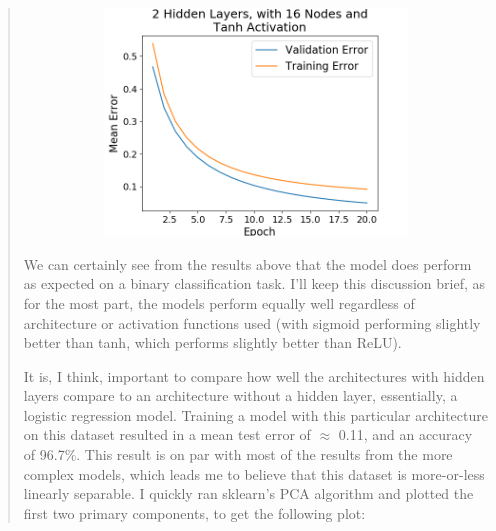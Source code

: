 \documentclass{article}
\begin{document}
\begin{quote}
\begin{figure}[h!]
\begin{subfigure}[h]{0.23\textwidth}
	\includegraphics[width=\textwidth]{figs/Cancer_Binary_Classification_2_Hidden_Layers_with_16_Nodes_and_Tanh_Activation.png}
\end{subfigure}
\end{figure}
	We can certainly see from the results above that the model does perform as expected on a binary classification task. I'll keep this discussion brief, as for the most part, the models perform equally well regardless of architecture or activation functions used (with sigmoid performing slightly better than tanh, which performs slightly better than ReLU).
	
	It is, I think, important to compare how well the architectures with hidden layers compare to an architecture without a hidden layer, essentially, a logistic regression model. Training a model with this particular architecture on this dataset resulted in a mean test error of $\approx$ 0.11, and an accuracy of 96.7\%. This result is on par with most of the results from the more complex models, which leads me to believe that this dataset is more-or-less linearly separable. I quickly ran sklearn's PCA algorithm and plotted the first two primary components, to get the following plot:
	

\end{quote}
\end{document}
